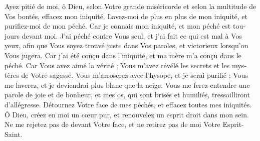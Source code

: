 {Ayez pitié de moi, ô Dieu, selon Votre grande misé­ri­corde}
{et selon la mul­ti­tude de Vos bon­tés, effa­cez mon ini­quité.}
{Lavez-moi de plus en plus de mon ini­quité, et puri­fiez-moi de mon péché.}
{Car je connais mon ini­quité,  et mon péché est tou­jours devant moi.}
{J’ai péché contre Vous seul, et j’ai fait ce qui est mal à Vos yeux, afin que Vous soyez trouvé juste dans Vos paroles, et vic­to­rieux lors­qu’on Vous jugera.}
{Car j’ai été conçu dans l’ini­quité, et ma mère m’a conçu dans le péché.}
{Car Vous avez aimé la vérité ; Vous m’avez révélé les secrets et les mys­tères de Votre sagesse.}
{Vous m’arro­se­rez avec l’hy­sope, et je serai puri­fié ; Vous me lave­rez, et je devien­drai plus blanc que la neige.}
{Vous me ferez entendre une parole de joie et de bon­heur, et mes os, qui sont bri­sés et humi­liés, tres­sailli­ront d’al­lé­gresse.}
{Détour­nez Votre face de mes péchés, et effa­cez toutes mes ini­qui­tés.}
{Ô Dieu, créez en moi un cœur pur, et renou­ve­lez un esprit droit dans mon sein.}
{Ne me reje­tez pas de devant Votre face, et ne reti­rez pas de moi Votre Esprit-Saint.}
